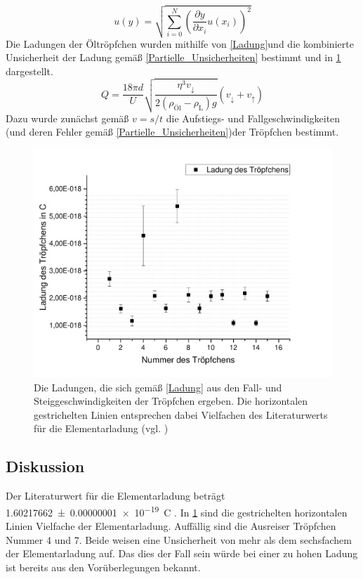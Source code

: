 \documentclass[
	a4paper,
	12pt,
	pagesize,
	ngerman
]{scrartcl}
\begin{document}
	\begin{equation}
	u(y) = \sqrt{  \sum_{i=0}^{N} \left( \frac{\partial y}{\partial x_i}u(x_i)\right)^2  }
	\label{Partielle_Unsicherheiten}
	\end{equation}
	Die Ladungen der Öltröpfchen wurden mithilfe von \cref{Ladung}und die kombinierte Unsicherheit der Ladung gemäß \cref{Partielle_Unsicherheiten}  bestimmt und in \cref{Tropf_Ladungen} dargestellt. %
	\begin{equation}
		Q=\frac{18 \pi d}{U} \sqrt{\frac{\eta^3 v_\downarrow}{2(\rho_\text{Öl}-\rho_\text{L})g}}(v_\downarrow + v_\uparrow)
		\label{Ladung}
	\end{equation}
	Dazu wurde zunächst gemäß $ v=s/t $ die Aufstiegs- und Fallgeschwindigkeiten (und deren Fehler gemäß \cref{Partielle_Unsicherheiten})der Tröpfchen bestimmt.
	\begin{figure}[H]
		\includegraphics[width=1\textwidth]{Troepfchenladungen}
		\centering
		\caption{Die Ladungen, die sich gemäß \cref{Ladung} aus den Fall- und Steiggeschwindigkeiten der Tröpfchen ergeben. Die horizontalen gestrichelten Linien entsprechen dabei Vielfachen des Literaturwerts für die Elementarladung (vgl. \cite{Elementarladung})}
		\label{Tropf_Ladungen}
		\centering
	\end{figure} 
	


	\subsection{Diskussion}
	Der Literaturwert für die Elementarladung beträgt \SI{1,60217662 \pm 0,00000001 e-19}{C} \cite{Elementarladung}.
	In \cref{Tropf_Ladungen} sind die gestrichelten horizontalen Linien Vielfache der Elementarladung.
	Auffällig sind die Ausreiser Tröpfchen Nummer 4 und 7. 
	Beide weisen eine Unsicherheit von mehr als dem sechsfachem der Elementarladung auf. 
	Das dies der Fall sein würde bei einer zu hohen Ladung ist bereits aus den Vorüberlegungen bekannt.
\end{document}
